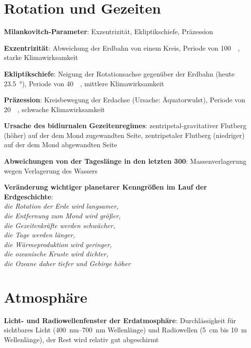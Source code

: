 \pagebreak

\section{%
    Rotation und Gezeiten%
}

\textbf{Milankovitch-Parameter}:
Exzentrizität,
Ekliptikschiefe,
Präzession

\textbf{Exzentrizität}:
Abweichung der Erdbahn von einem Kreis,
Periode von \SI{100}{\kilo\year},
starke Klimawirksamkeit

\textbf{Ekliptikschiefe}:
Neigung der Rotationsachse gegenüber der Erdbahn
(heute \SI{23.5}{\degree}),
Periode von \SI{40}{\kilo\year},
mittlere Klimawirksamkeit

\textbf{Präzession}:
Kreisbewegung der Erdachse
(Ursache: Äquatorwulst),
Periode von \SI{20}{\kilo\year},
schwache Klimawirksamkeit

\textbf{Ursache des bidiurnalen Gezeitenregimes}:
zentripetal-gravitativer Flutberg (höher) auf der dem Mond zugewandten Seite,
zentripetaler Flutberg (niedriger) auf der dem Mond abgewandten Seite

\textbf{Abweichungen von der Tageslänge in den letzten \SI{300}{\year}}:
Massenverlagerung wegen Verlagerung des Wassers

\begin{wichtig}
    \item
    \textbf{Veränderung wichtiger planetarer Kenngrößen im Lauf der Erdgeschichte}:\\
    \emph{die Rotation der Erde wird langsamer,\\
    die Entfernung zum Mond wird größer,\\
    die Gezeitenkräfte werden schwächer,\\
    die Tage werden länger,\\
    die Wärmeproduktion wird geringer,\\
    die ozeanische Kruste wird dichter,\\
    die Ozeane daher tiefer und Gebirge höher}
\end{wichtig}

\pagebreak

\section{%
    Atmosphäre%
}

\textbf{Licht- und Radiowellenfenster der Erdatmosphäre}:
Durchlässigkeit für sichtbares Licht (\SIrange{400}{700}{\nano\meter} Wellenlänge)
und Radiowellen (\SI{5}{\centi\meter} bis \SI{10}{\meter} Wellenlänge),
der Rest wird relativ gut abgeschirmt

